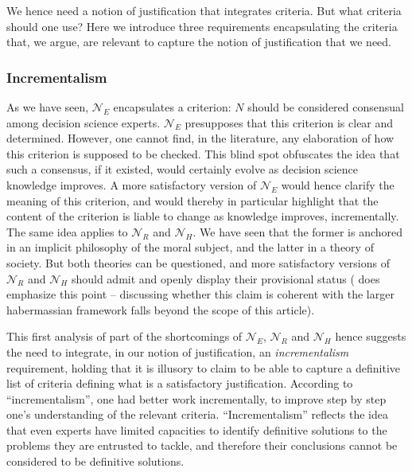 \documentclass[preprint, french, english, 11pt, authoryear]{elsarticle}%
\begin{document}
We hence need a notion of justification that integrates criteria. But what criteria should one use? Here we introduce three requirements encapsulating the criteria that, we argue, are relevant to capture the notion of justification that we need.

\subsubsection{Incrementalism}
As we have seen, $\mathscr{N}_E$ encapsulates a criterion: $N$ should be considered consensual among decision science experts. $\mathscr{N}_E$ presupposes that this criterion is clear and determined. However, one cannot find, in the literature, any elaboration of how this criterion is supposed to be checked. This blind spot obfuscates the idea that such a consensus, if it existed, would certainly evolve as decision science knowledge improves. A more satisfactory version of $\mathscr{N}_E$ would hence clarify the meaning of this criterion, and would thereby in particular highlight that the content of the criterion is liable to change as knowledge improves, incrementally. The same idea applies to $\mathscr{N}_{R}$ and $\mathscr{N}_{H}$. We have seen that the former is anchored in an implicit philosophy of the moral subject, and the latter in a theory of society. But both theories can be questioned, and more satisfactory versions of $\mathscr{N}_{R}$ and $\mathscr{N}_{H}$ should admit and openly display their provisional status (\cite{habermas_moralbewustsein_1983} does emphasize this point -- discussing whether this claim is coherent with the larger habermassian framework falls beyond the scope of this article).

This first analysis of part of the shortcomings of $\mathscr{N}_E$, $\mathscr{N}_{R}$ and $\mathscr{N}_{H}$ hence suggests the need to integrate, in our notion of justification, an \emph{incrementalism} requirement, holding that it is illusory to claim to be able to capture a definitive list of criteria defining what is a satisfactory justification. According to “incrementalism”, one had better work incrementally, to improve step by step one's understanding of the relevant criteria. “Incrementalism” reflects the idea that even experts have limited capacities to identify definitive solutions to the problems they are entrusted to tackle, and therefore their conclusions cannot be considered to be definitive solutions.
\end{document}
